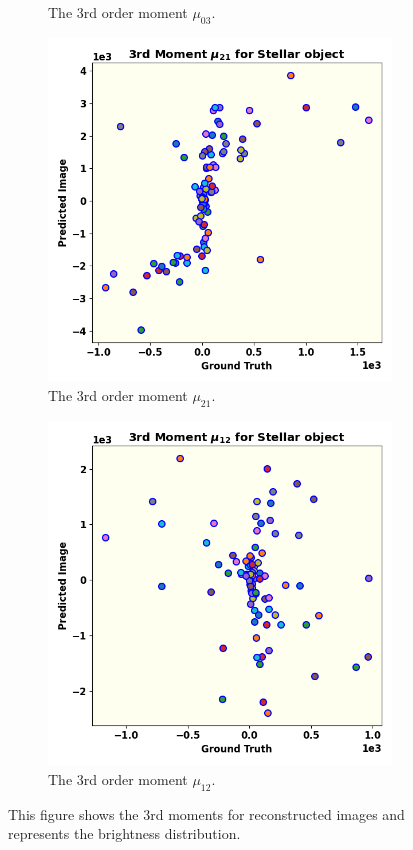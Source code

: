 \begin{figure}
\begin{subfigure}{0.50\linewidth}
		\caption{The 3rd order moment $\mu_{03}$.}
		\label{fig:mom8}
	\end{subfigure}\hfill
	\begin{subfigure}{0.50\linewidth}
		\includegraphics[width=\linewidth]{fig/moments/mom8.png}
		\caption{The 3rd order moment $\mu_{21}$.}
		\label{fig:mom9}
	\end{subfigure}\hfill
	\begin{subfigure}{0.50\linewidth}
		\includegraphics[width=\linewidth]{fig/moments/mom9.png}
		\caption{The 3rd order moment $\mu_{12}$.}
		\label{fig:mom10}
	\end{subfigure}\hfill
	\caption{This figure shows the 3rd moments for reconstructed images and represents the brightness distribution.}
	\label{fig:moments}
\end{figure}

